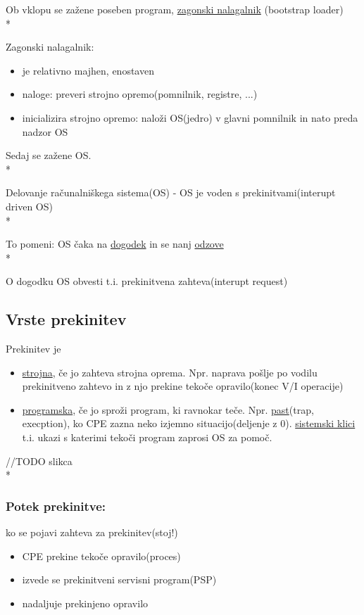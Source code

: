 \documentclass[
  slovene,
  a4paper
]{book}
\begin{document}
Ob vklopu se zažene poseben program, \underline{zagonski nalagalnik} (bootstrap loader)\\*

Zagonski nalagalnik:
\begin{itemize}
  \item je relativno majhen, enostaven
  \item naloge: preveri strojno opremo(pomnilnik, registre, ...)
  \item inicializira strojno opremo: naloži OS(jedro) v glavni pomnilnik in nato preda nadzor OS
\end{itemize}

Sedaj se zažene OS.\\*

Delovanje računalniškega sistema(OS) - OS je voden s prekinitvami(interupt driven OS)\\*

To pomeni: OS čaka na \underline{dogodek} in se nanj \underline{odzove}\\*

O dogodku OS obvesti t.i. prekinitvena zahteva(interupt request)

\subsection{Vrste prekinitev}
Prekinitev je
\begin{itemize}
  \item \underline{strojna}, če jo zahteva strojna oprema. Npr. naprava pošlje po vodilu prekinitveno zahtevo in z njo prekine tekoče opravilo(konec V/I operacije)
  \item \underline{programska}, če jo sproži program, ki ravnokar teče. Npr. \underline{past}(trap, execption), ko CPE zazna neko izjemno situacijo(deljenje z 0). \underline{sistemski klici} t.i. ukazi s katerimi tekoči program zaprosi OS za pomoč.
\end{itemize}

//TODO slikca\\*

\subsubsection{Potek prekinitve:}
ko se pojavi zahteva za prekinitev(stoj!)

\begin{itemize}
  \item CPE prekine tekoče opravilo(proces)
  \item izvede se prekinitveni servisni program(PSP)
  \item nadaljuje prekinjeno opravilo
\end{itemize} 
\end{document}
